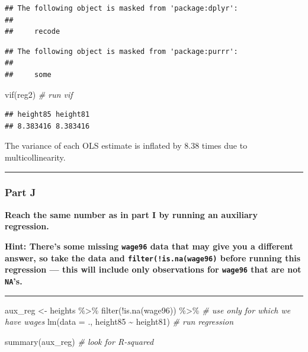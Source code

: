 \documentclass[
]{article}
\newenvironment{Shaded}{\begin{snugshade}}{\end{snugshade}}
\newcommand{\AttributeTok}[1]{\textcolor[rgb]{0.77,0.63,0.00}{#1}}
\newcommand{\CommentTok}[1]{\textcolor[rgb]{0.56,0.35,0.01}{\textit{#1}}}
\newcommand{\FunctionTok}[1]{\textcolor[rgb]{0.00,0.00,0.00}{#1}}
\newcommand{\NormalTok}[1]{#1}
\newcommand{\OtherTok}[1]{\textcolor[rgb]{0.56,0.35,0.01}{#1}}
\newcommand{\SpecialCharTok}[1]{\textcolor[rgb]{0.00,0.00,0.00}{#1}}
\begin{document}
\begin{verbatim}
## The following object is masked from 'package:dplyr':
## 
##     recode
\end{verbatim}

\begin{verbatim}
## The following object is masked from 'package:purrr':
## 
##     some
\end{verbatim}

\begin{Shaded}
\begin{Highlighting}[]
\FunctionTok{vif}\NormalTok{(reg2) }\CommentTok{\# run vif }
\end{Highlighting}
\end{Shaded}

\begin{verbatim}
## height85 height81 
## 8.383416 8.383416
\end{verbatim}

The variance of each OLS estimate is inflated by 8.38 times due to
multicollinearity.

\begin{center}\rule{0.5\linewidth}{0.5pt}\end{center}

\hypertarget{part-j-1}{%
\subsubsection{Part J}\label{part-j-1}}

\textbf{Reach the same number as in part I by running an auxiliary
regression.}

\textbf{Hint: There's some missing \texttt{wage96} data that may give
you a different answer, so take the data and
\texttt{filter(!is.na(wage96)} before running this regression --- this
will include only observations for \texttt{wage96} that are not
\texttt{NA}'s.}

\begin{center}\rule{0.5\linewidth}{0.5pt}\end{center}

\begin{Shaded}
\begin{Highlighting}[]
\NormalTok{aux\_reg }\OtherTok{\textless{}{-}}\NormalTok{ heights }\SpecialCharTok{\%\textgreater{}\%}
  \FunctionTok{filter}\NormalTok{(}\SpecialCharTok{!}\FunctionTok{is.na}\NormalTok{(wage96)) }\SpecialCharTok{\%\textgreater{}\%} \CommentTok{\# use only for which we have wages}
  \FunctionTok{lm}\NormalTok{(}\AttributeTok{data =}\NormalTok{ ., height85 }\SpecialCharTok{\textasciitilde{}}\NormalTok{ height81) }\CommentTok{\# run regression}

\FunctionTok{summary}\NormalTok{(aux\_reg) }\CommentTok{\# look for R{-}squared}
\end{Highlighting}
\end{Shaded}
\end{document}
